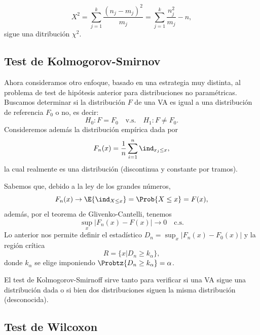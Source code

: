 \begin{equation}
	  	X^2 = \sum_{j=1}^k  \frac{(n_j - m_j)^2}{m_j} = \sum_{j=1}^k  \frac{n_j^2}{m_j} - n,
  \end{equation}  
sigue una ditribución $\chi^2$.



\subsection{Test de Kolmogorov-Smirnov} 
\label{sub:test_KS}

Ahora consideramos otro enfoque, basado en una estrategia muy distinta, al problema de test de hipótesis anterior para distribuciones no paramétricas. Buscamos determinar si la distribución $F$ de una VA es igual a una distribución de referencia $F_0$ o no, es decir: 
	\begin{equation}
		H_0:F=F_0\quad \text{v.s.}\quad H_1:F\neq F_0.
	\end{equation}
Consideremos además la distribución empírica dada por 
\begin{equation}
	F_n(x) = \frac{1}{n}\sum_{i=1}^n\ind_{x_j\leq x}, 
\end{equation}
la cual realmente es una distribución (discontinua y  constante por tramos). 

Sabemos que, debido a la ley de los grandes números, 
\begin{equation}
	F_n(x)\to \E{\ind_{X\leq x}} = \Prob{X\leq x} =  F(x),
\end{equation}
además, por el teorema de Glivenko-Cantelli, tenemos 
\begin{equation}
	\sup_x|F_n(x)-F(x)| \to 0 \quad\text{c.s.}
\end{equation}
Lo anterior nos permite definir el estadístico  $D_n = \sup_x|F_n(x)-F_0(x)|$ y la región crítica
\begin{equation}
	R = \{x|D_n\geq k_\alpha\},
\end{equation}
donde $k_\alpha$ se elige imponiendo $\Probtz{D_n\geq  k_\alpha}=\alpha$.

\begin{remark}
El test de  Kolmogorov-Smirnoff sirve tanto para verificar si una VA sigue una distribución dada o si bien dos distribuciones siguen la misma distribución (desconocida).
\end{remark}

\subsection{Test de Wilcoxon} 
\label{sub:test_Wilc}

